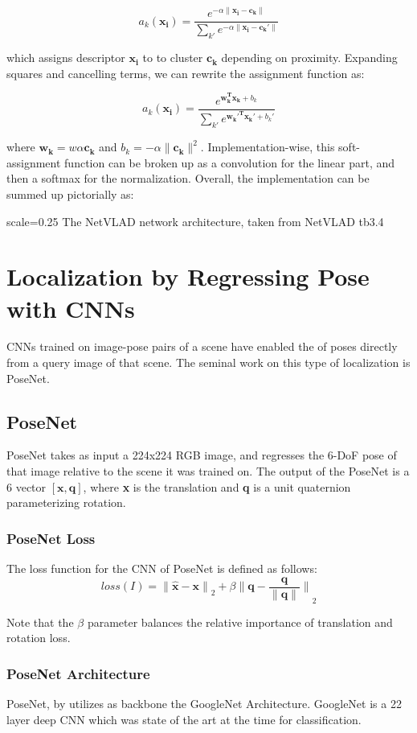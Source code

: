 \[a_k(\mathbf{x_i}) = \frac{e^{-\alpha\|\mathbf{x_i - c_k}\|}}{\sum_{k'}e^{-\alpha\|\mathbf{x_i - c_k'}\|}}\]

which assigns descriptor $\mathbf{x_i}$ to to cluster $\mathbf{c_k}$ depending on proximity. Expanding squares and cancelling terms, we can rewrite the assignment
function as:

\[a_k(\mathbf{x_i}) = \frac{e^{\mathbf{w_k^T x_k} + b_k}}{\sum_{k'}e^{\mathbf{w_k'^T x_k'} + b_k'}}\]

where $\mathbf{w_k} = w\alpha\mathbf{c_k}$ and $b_k = -\alpha\|\mathbf{c_k}\|^2$. Implementation-wise, this soft-assignment function can be broken up as a convolution
for the linear part, and then a softmax for the normalization. Overall, the implementation can be summed up pictorially as:

{scale=0.25}%
{The NetVLAD network architecture, taken from \cite{Arandlejovic2015}}%
{NetVLAD}%
{tb3.4} %

\section{Localization by Regressing Pose with CNNs}
CNNs trained on image-pose pairs of a scene have enabled the  of poses directly from a query image of that scene. The seminal work on this type of localization is PoseNet.

\subsection{PoseNet}
PoseNet takes as input a 224x224 RGB image, and regresses the 6-DoF pose of that image relative to the scene it was trained on. The output of the PoseNet is a 6 vector $[\mathbf{x}, \mathbf{q}]$, where \textbf{x} is the translation and \textbf{q} is a unit quaternion parameterizing rotation. 

\subsubsection{PoseNet Loss}
The loss function for the CNN of PoseNet is defined as follows:
\[loss(I) = \mathbf{\|\hat{x} - x\|}_2 + \beta\mathbf{\|q - \dfrac{q}{\|q\|}\|}_2\]

Note that the $\beta$ parameter balances the relative importance of translation and rotation loss.

\subsubsection{PoseNet Architecture}
PoseNet, by \cite{Kendall2015} utilizes as backbone the GoogleNet Architecture. GoogleNet is a 22 layer deep CNN which was state of the art at the time for classification.

